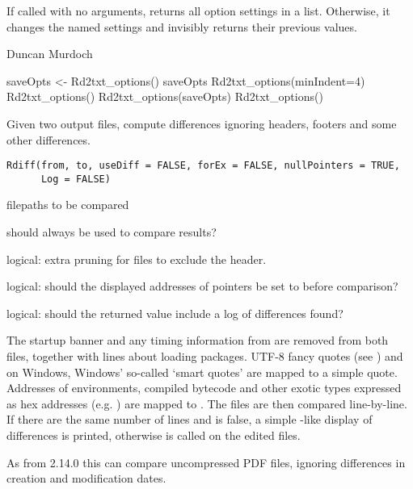 %
\begin{Value}
 
If called with no arguments, returns all option settings in a list.
Otherwise, it changes the named settings and invisibly returns their
previous values.
\end{Value}
%
\begin{Author}\relax
Duncan Murdoch
\end{Author}
%
\begin{SeeAlso}\relax
{}
\end{SeeAlso}
%
\begin{Examples}
\begin{ExampleCode}
saveOpts <- Rd2txt_options()
saveOpts
Rd2txt_options(minIndent=4)
Rd2txt_options()
Rd2txt_options(saveOpts)
Rd2txt_options()
\end{ExampleCode}
\end{Examples}
%
\begin{Description}\relax
Given two \R{} output files, compute differences ignoring headers,
footers and some other differences.
\end{Description}
%
\begin{Usage}
\begin{verbatim}
Rdiff(from, to, useDiff = FALSE, forEx = FALSE, nullPointers = TRUE,
      Log = FALSE)
\end{verbatim}
\end{Usage}
%
\begin{Arguments}
\begin{ldescription}
\item[\code{from, to}] filepaths to be compared
\item[\code{useDiff}] should  always be used to compare
results?
\item[\code{forEx}] logical: extra pruning for  files to
exclude the header.
\item[\code{nullPointers}] logical: should the displayed addresses of
pointers be set to  before comparison?
\item[\code{Log}] logical: should the returned value include a log of
differences found?
\end{ldescription}
\end{Arguments}
%
\begin{Details}\relax
The \R{} startup banner and any timing information from  are removed from both files, together with lines about loading
packages.  UTF-8 fancy quotes (see ) and on
Windows, Windows' so-called `smart quotes' are mapped to a
simple quote.  Addresses of environments, compiled bytecode and other
exotic types expressed as hex addresses (e.g. ) are mapped to .  The files are then
compared line-by-line.  If there are the same number of lines and
 is false, a simple -like display of
differences is printed, otherwise  is called on the
edited files.

As from \R{} 2.14.0 this can compare uncompressed PDF files, ignoring
differences in creation and modification dates.
\end{Details}

